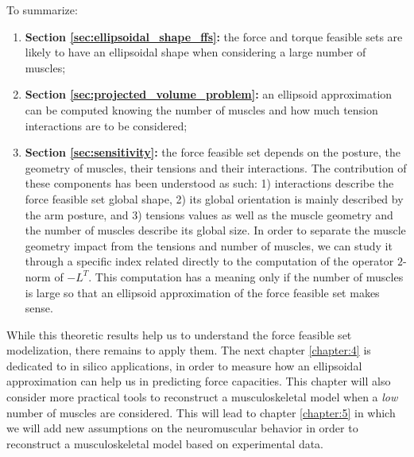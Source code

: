 To summarize: 
\begin{enumerate}
    \item {\textbf{Section \ref{sec:ellipsoidal_shape_ffs}:} the force and torque feasible sets are likely to have an ellipsoidal shape when considering a large number of muscles;}
    \item {\textbf{Section \ref{sec:projected_volume_problem}:} an ellipsoid approximation can be computed knowing the number of muscles and how much tension interactions are to be considered;}
    \item {\textbf{Section \ref{sec:sensitivity}:} the force feasible set depends on the posture, the geometry of muscles, their tensions and their interactions. The contribution of these components has been understood as such: 1) interactions describe the force feasible set global shape, 2) its global orientation is mainly described by the arm posture, and 3) tensions values as well as the muscle geometry and the number of muscles describe its global size.  In order to separate the muscle geometry impact from the tensions and number of muscles, we can study it through a specific index related directly to the computation of the operator $2$-norm of $-L^T$. This computation has a meaning only if the number of muscles is large so that an ellipsoid approximation of the force feasible set makes sense.}
\end{enumerate}

While this theoretic results help us to understand the force feasible set modelization, there remains to apply them. The next chapter \ref{chapter:4} is dedicated to in silico applications, in order to measure how an ellipsoidal approximation can help us in predicting force capacities. This chapter will also consider more practical tools to reconstruct a musculoskeletal model when a \emph{low} number of muscles are considered. This will lead to chapter \ref{chapter:5} in which we will add new assumptions on the neuromuscular behavior in order to reconstruct a musculoskeletal model based on experimental data.
